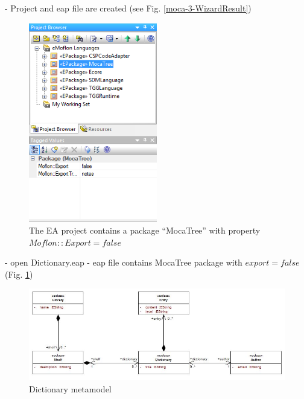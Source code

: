 - Project and eap file are created (see Fig. \ref{moca-3-WizardResult})

\begin{figure}[htp]
\begin{center}
 \includegraphics[width=0.5\textwidth]{pics/moca/1DictionaryMetaModel/4-eapContainsMocatreeWithExportFalse}
  \caption{The EA project contains a package ``MocaTree'' with property
  $Moflon::Export = false$}
  \label{moca-4-eapContainsMocatreeWithExportFalse}
\end{center}
\end{figure}

- open Dictionary.eap
- eap file contains MocaTree package with $export = false$ (Fig.
\ref{moca-4-eapContainsMocatreeWithExportFalse})

\begin{figure}[htp]
\begin{center}
 \includegraphics[width=\textwidth]{pics/moca/1DictionaryMetaModel/5-DictionaryMM}
  \caption{Dictionary metamodel}
  \label{moca-5-DictionaryMM}
\end{center}
\end{figure}


